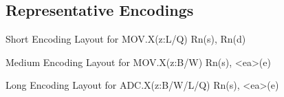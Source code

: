\subsection{Representative Encodings}
\begin{manuallistedbitdiagram}{Short Encoding Layout for MOV.X(z:L/Q) Rn(s), Rn(d)}
\end{manuallistedbitdiagram}

\begin{manuallistedbitdiagram}{Medium Encoding Layout for MOV.X(z:B/W) Rn(s), \textless{}ea\textgreater{}(e)}
\end{manuallistedbitdiagram}

\begin{manuallistedbitdiagram}{Long Encoding Layout for ADC.X(z:B/W/L/Q) Rn(s), \textless{}ea\textgreater{}(e)}
\end{manuallistedbitdiagram}
